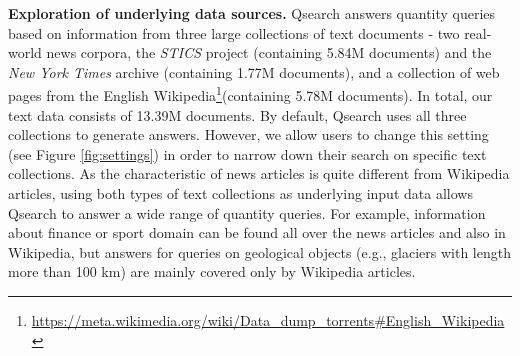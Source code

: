 \noindent \textbf{Exploration of underlying data sources.} Qsearch answers quantity queries based on information from three large collections of text documents - two real-world news corpora, the \textit{STICS} project \cite{DBLP:conf/sigir/HoffartMW14} (containing 5.84M documents) and the \textit{New York Times} archive \cite{nyt} (containing 1.77M documents), and a collection of web pages from the English Wikipedia\footnote{\url{https://meta.wikimedia.org/wiki/Data\_dump\_torrents\#English\_Wikipedia}}(containing 5.78M documents). In total, our text data consists of 13.39M documents. By default, Qsearch uses all three collections to generate answers. However, we allow users to change this setting (see Figure \ref{fig:settings}) in order to narrow down their search on specific text collections. As the characteristic of news articles is quite different from Wikipedia articles, using both types of text collections as underlying input data allows Qsearch to answer a wide range of quantity queries. For example, information about finance or sport domain can be found all over the news articles and also in Wikipedia, but answers for queries on geological objects (e.g., glaciers with length more than 100 km) are mainly covered only by Wikipedia articles. 

